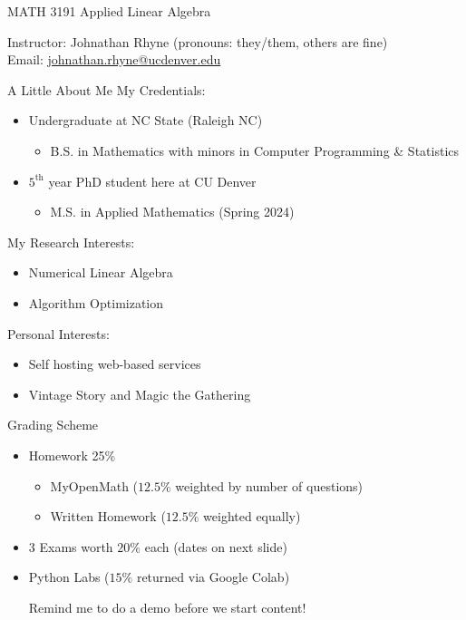 \documentclass[aspectratio=169]{beamer}
\begin{document}
\begin{frame}{MATH 3191 Applied Linear Algebra}

Instructor: Johnathan Rhyne (pronouns: they/them, others are fine)\\
Email: \href{johnathan.rhyne@ucdenver.edu}{johnathan.rhyne@ucdenver.edu}
\end{frame}
\begin{frame}{A Little About Me}
    My Credentials:
    \begin{itemize}
        \item Undergraduate at NC State (Raleigh NC)
        \begin{itemize}
            \item B.S. in Mathematics with minors in Computer Programming \& Statistics
        \end{itemize}
        \item $5^\text{th}$ year PhD student here at CU Denver
        \begin{itemize}
            \item M.S. in Applied Mathematics (Spring 2024)
        \end{itemize}
    \end{itemize}
    \pause
    My Research Interests:
    \begin{itemize}
        \item Numerical Linear Algebra
        \item Algorithm Optimization
    \end{itemize}
    \pause
    Personal Interests:
    \begin{itemize}
        \item Self hosting web-based services
        \item Vintage Story and Magic the Gathering
    \end{itemize}
\end{frame}
\begin{frame}{Grading Scheme}
    \begin{itemize}
        \item Homework 25\%
        \begin{itemize}
            \item MyOpenMath ($12.5\%$ weighted by number of questions)
            \item Written Homework ($12.5\%$ weighted equally)
        \end{itemize}
        \item 3 Exams worth $20\%$ each (dates on next slide)
        \item Python Labs ($15\%$ returned via Google Colab)


            Remind me to do a demo before we start content!
    \end{itemize}
\end{frame}
\end{document}
